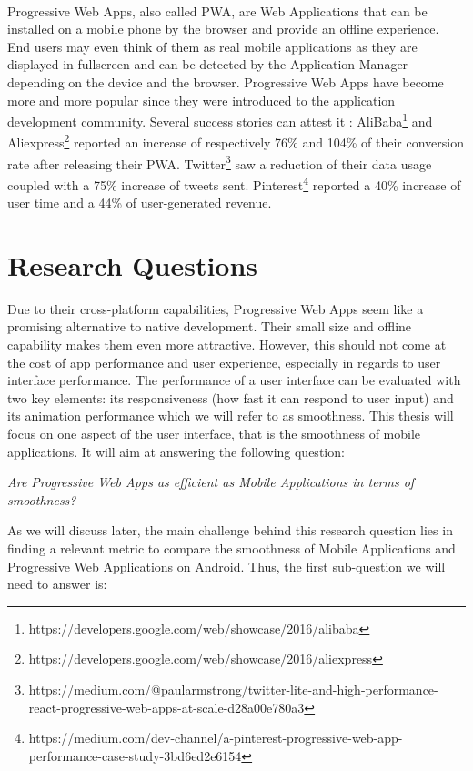 \documentclass{kththesis}
\begin{document}
\paragraph{}
Progressive Web Apps, also called PWA, are Web Applications that can be installed on a mobile phone by the browser and provide an offline experience. End users may even think of them as real mobile applications as they are displayed in fullscreen and can be detected by the Application Manager depending on the device and the browser.
Progressive Web Apps have become more and more popular since they were introduced to the application development community. Several success stories can attest it : AliBaba\footnote{https://developers.google.com/web/showcase/2016/alibaba} and Aliexpress\footnote{https://developers.google.com/web/showcase/2016/aliexpress} reported an increase of respectively 76\% and 104\% of their conversion rate after releasing their PWA. Twitter\footnote{https://medium.com/@paularmstrong/twitter-lite-and-high-performance-react-progressive-web-apps-at-scale-d28a00e780a3} saw a reduction of their data usage coupled with a 75\% increase of tweets sent. Pinterest\footnote{https://medium.com/dev-channel/a-pinterest-progressive-web-app-performance-case-study-3bd6ed2e6154} reported a 40\% increase of user time and a 44\% of user-generated revenue. 



\section{Research Questions}

Due to their cross-platform capabilities, Progressive Web Apps seem like a promising alternative to native development. Their small size and offline capability makes them even more attractive. However, this should not come at the cost of app performance and user experience, especially in regards to user interface performance. The performance of a user interface can be evaluated with two key elements: its responsiveness (how fast it can respond to user input) and its animation performance which we will refer to as smoothness. 
This thesis will focus on one aspect of the user interface, that is the smoothness of mobile applications. It will aim at answering the following question: 
\begin{center}
    \textit{Are Progressive Web Apps as efficient as Mobile Applications in terms of smoothness?}
\end{center}
As we will discuss later, the main challenge behind this research question lies in finding a relevant metric to compare the smoothness of Mobile Applications and Progressive Web Applications on Android. Thus, the first sub-question we will need to answer is: \newline
\end{document}
